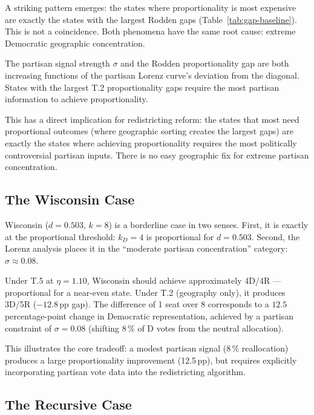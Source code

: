 A striking pattern emerges: the states where proportionality is most expensive
are exactly the states with the largest Rodden gaps (Table~\ref{tab:gap-baseline}).
This is not a coincidence. Both phenomena have the same root cause: extreme
Democratic geographic concentration.

\begin{proposition}
\label{prop:rodden-sigma}
The partisan signal strength $\sigma$ and the Rodden proportionality gap are
both increasing functions of the partisan Lorenz curve's deviation from the
diagonal. States with the largest T.2 proportionality gaps require the most
partisan information to achieve proportionality.
\end{proposition}

This has a direct implication for redistricting reform: the states that most
need proportional outcomes (where geographic sorting creates the largest gaps)
are exactly the states where achieving proportionality requires the most
politically controversial partisan inputs. There is no easy geographic fix
for extreme partisan concentration.

\subsection{The Wisconsin Case}

Wisconsin ($d = 0.503$, $k=8$) is a borderline case in two senses.
First, it is exactly at the proportional threshold: $k_D = 4$ is proportional
for $d = 0.503$.
Second, the Lorenz analysis places it in the ``moderate partisan concentration''
category: $\sigma \approx 0.08$.

Under T.5 at $\eta = 1.10$, Wisconsin should achieve approximately 4D/4R ---
proportional for a near-even state.
Under T.2 (geography only), it produces 3D/5R ($-12.8$\,pp gap).
The difference of 1 seat over 8 corresponds to a $12.5$ percentage-point
change in Democratic representation, achieved by a partisan constraint
of $\sigma = 0.08$ (shifting 8\,\% of D votes from the neutral allocation).

This illustrates the core tradeoff: a modest partisan signal (8\,\% reallocation)
produces a large proportionality improvement (12.5\,pp), but requires
explicitly incorporating partisan vote data into the redistricting algorithm.

\subsection{The Recursive Case}

